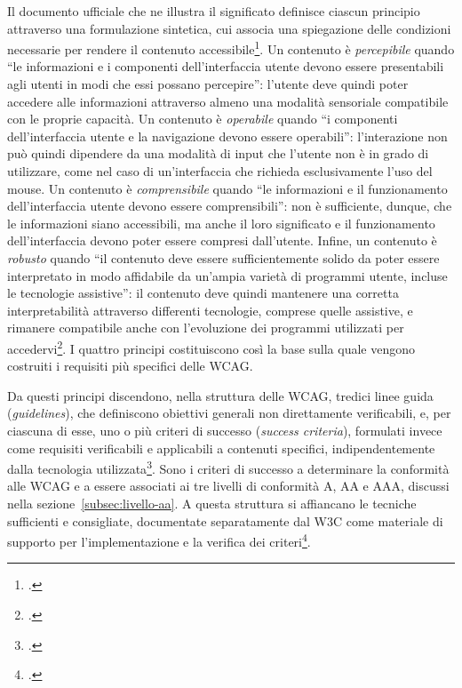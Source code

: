 Il documento ufficiale che ne illustra il significato definisce ciascun principio attraverso una formulazione sintetica, cui associa una spiegazione delle condizioni necessarie per rendere il contenuto accessibile\footcite[§ \enquote{Understanding the Four Principles of Accessibility}]{w3c:understanding-intro}. Un contenuto è \emph{percepibile} quando \enquote{le informazioni e i componenti dell'interfaccia utente devono essere presentabili agli utenti in modi che essi possano percepire}: l'utente deve quindi poter accedere alle informazioni attraverso almeno una modalità sensoriale compatibile con le proprie capacità. Un contenuto è \emph{operabile} quando \enquote{i componenti dell'interfaccia utente e la navigazione devono essere operabili}: l'interazione non può quindi dipendere da una modalità di input che l'utente non è in grado di utilizzare, come nel caso di un'interfaccia che richieda esclusivamente l'uso del mouse. Un contenuto è \emph{comprensibile} quando \enquote{le informazioni e il funzionamento dell'interfaccia utente devono essere comprensibili}: non è sufficiente, dunque, che le informazioni siano accessibili, ma anche il loro significato e il funzionamento dell'interfaccia devono poter essere compresi dall'utente. Infine, un contenuto è \emph{robusto} quando \enquote{il contenuto deve essere sufficientemente solido da poter essere interpretato in modo affidabile da un'ampia varietà di programmi utente, incluse le tecnologie assistive}: il contenuto deve quindi mantenere una corretta interpretabilità attraverso differenti tecnologie, comprese quelle assistive, e rimanere compatibile anche con l'evoluzione dei programmi utilizzati per accedervi\footcite[\enquote{If any of these are not true, users with disabilities will not be able to use the web.}]{w3c:understanding-intro}. I quattro principi costituiscono così la base sulla quale vengono costruiti i requisiti più specifici delle WCAG.

Da questi principi discendono, nella struttura delle WCAG, tredici linee guida (\emph{guidelines}), che definiscono obiettivi generali non direttamente verificabili, e, per ciascuna di esse, uno o più criteri di successo (\emph{success criteria}), formulati invece come requisiti verificabili e applicabili a contenuti specifici, indipendentemente dalla tecnologia utilizzata\footcite[§~0.2 \enquote{WCAG 2 Livelli di orientamento}]{w3c:wcag21}. Sono i criteri di successo a determinare la conformità alle WCAG e a essere associati ai tre livelli di conformità A, AA e AAA, discussi nella sezione~\ref{subsec:livello-aa}. A questa struttura si affiancano le tecniche sufficienti e consigliate, documentate separatamente dal W3C come materiale di supporto per l'implementazione e la verifica dei criteri\footcite{w3c:quickref}.

